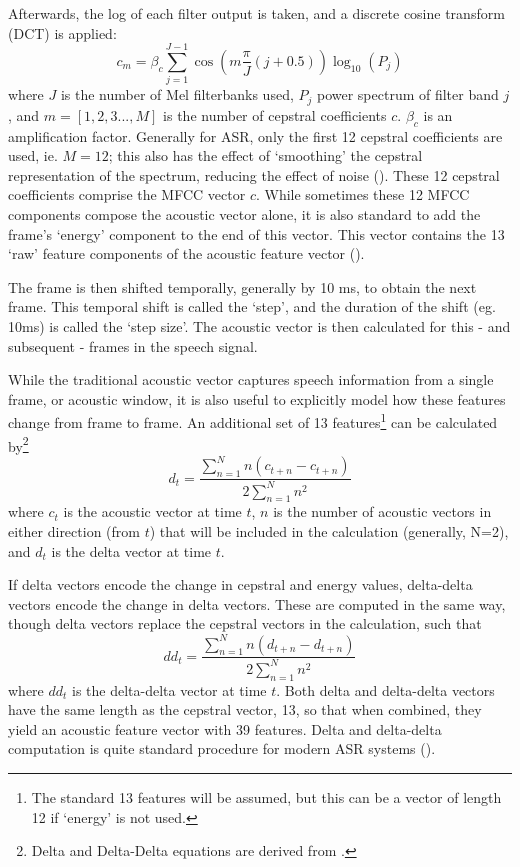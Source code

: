Afterwards, the log of each filter output is taken, and a discrete cosine transform (DCT) is applied: \begin{equation}\label{eq:mfcc-calculation} c_m = \beta_c \sum_{j=1}^{J-1} \cos(m\dfrac{\pi}{J} (j+0.5)) \log_{10} (P_j) \end{equation} where $J$ is the number of Mel filterbanks used, $P_j$ power spectrum of filter band $j$, and $m=[1,2,3...,M]$ is the number of cepstral coefficients $c$.  $\beta_c$ is an amplification factor.  Generally for ASR, only the first 12 cepstral coefficients are used, ie. $M=12$; this also has the effect of `smoothing' the cepstral representation of the spectrum, reducing the effect of noise (\cite{gold:11}).  These 12 cepstral coefficients comprise the MFCC vector $c$.  While sometimes these 12 MFCC components compose the acoustic vector alone, it is also standard to add the frame's `energy' component to the end of this vector.  This vector contains the 13 `raw' feature components of the acoustic feature vector (\cite{jurafsky:09}).  

The frame is then shifted temporally, generally by 10 ms, to obtain the next frame. This temporal shift is called the `step', and the duration of the shift (eg. 10ms) is called the `step size'.  The acoustic vector is then calculated for this - and subsequent - frames in the speech signal.

While the traditional acoustic vector captures speech information from a single frame, or acoustic window, it is also useful to explicitly model how these features change from frame to frame.  An additional set of 13 features\footnote{The standard 13 features will be assumed, but this can be a vector of length 12 if `energy' is not used.} can be calculated by\footnote{Delta and Delta-Delta equations are derived from \cite{gold:11}.} \begin{equation} d_t = \dfrac{\sum_{n=1}^{N} n(c_{t+n} - c_{t+n})}{2\sum_{n=1}^{N} n^2} \end{equation} where $c_t$ is the acoustic vector at time $t$, $n$ is the number of acoustic vectors in either direction (from $t$) that will be included in the calculation (generally, N=2), and $d_t$ is the delta vector at time $t$.  

If delta vectors encode the change in cepstral and energy values, delta-delta vectors encode the change in delta vectors.  These are computed in the same way, though delta vectors replace the cepstral vectors in the calculation, such that \begin{equation} dd_t = \dfrac{\sum_{n=1}^{N} n(d_{t+n} - d_{t+n})}{2\sum_{n=1}^{N} n^2} \end{equation} where $dd_t$ is the delta-delta vector at time $t$.  Both delta and delta-delta vectors have the same length as the cepstral vector, 13, so that when combined, they yield an acoustic feature vector with 39 features.  %
Delta and delta-delta computation is quite standard procedure for modern ASR systems (\cite{htk:15}).


